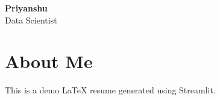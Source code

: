 \documentclass[12pt]{article}
\begin{document}
\begin{center}
    \Huge \textbf{Priyanshu} \\
    \large Data Scientist \\
\end{center}

\section*{About Me}
This is a demo LaTeX resume generated using Streamlit.
\end{document}
